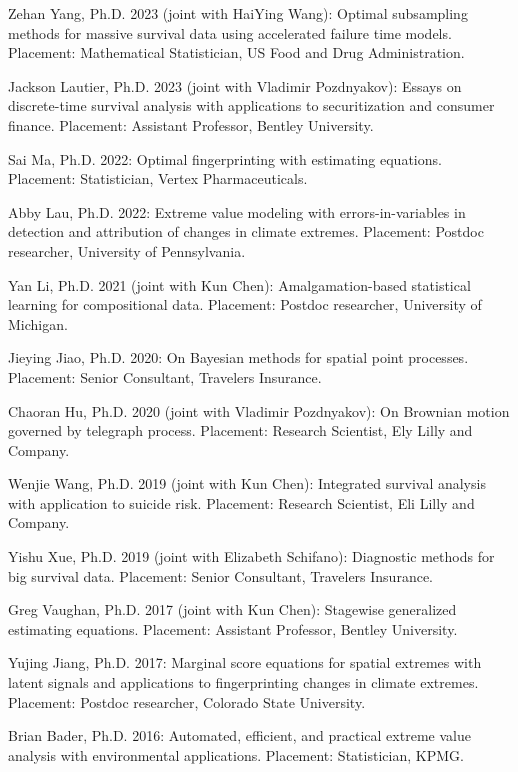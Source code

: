 \documentclass[Statistics]{vita}
\begin{document}
\begin{vita}
\begin{Students}
\begin{Ph.D.}
    \item Zehan Yang, Ph.D. 2023 (joint with HaiYing Wang): Optimal subsampling methods for massive survival data using accelerated failure time models. Placement: Mathematical Statistician, US Food and Drug Administration.
    \item Jackson Lautier, Ph.D. 2023 (joint with Vladimir Pozdnyakov): Essays on discrete-time survival analysis with applications to securitization and consumer finance. Placement: Assistant Professor, Bentley University. 
    \item Sai Ma, Ph.D. 2022: Optimal fingerprinting with estimating equations. Placement: Statistician, Vertex Pharmaceuticals.
    \item Abby Lau, Ph.D. 2022: Extreme value modeling with errors-in-variables in detection and attribution of changes in climate extremes. Placement: Postdoc researcher, University of Pennsylvania.
    \item Yan Li, Ph.D. 2021 (joint with Kun Chen): Amalgamation-based statistical learning for compositional data. Placement: Postdoc researcher, University of Michigan.
    \item Jieying Jiao, Ph.D. 2020: On Bayesian methods for spatial point processes. Placement: Senior Consultant, Travelers Insurance.
    \item Chaoran Hu, Ph.D. 2020 (joint with Vladimir Pozdnyakov): On Brownian motion governed by telegraph process. Placement: Research Scientist, Ely Lilly and Company.
    \item Wenjie Wang, Ph.D. 2019 (joint with Kun Chen): Integrated survival analysis with application to suicide risk. Placement: Research Scientist, Eli Lilly and Company.
    \item Yishu Xue, Ph.D. 2019 (joint with Elizabeth Schifano): Diagnostic methods for big survival data. Placement: Senior Consultant, Travelers Insurance.
    \item Greg Vaughan, Ph.D. 2017 (joint with Kun Chen): Stagewise generalized estimating equations. Placement: Assistant Professor, Bentley University.
    \item Yujing Jiang, Ph.D. 2017: Marginal score equations for spatial extremes with latent signals and applications to fingerprinting changes in climate extremes. Placement: Postdoc researcher, Colorado State University.
    \item Brian Bader, Ph.D. 2016: Automated, efficient, and practical extreme value analysis with environmental applications. Placement: Statistician, KPMG.

\end{Ph.D.}
\end{Students}
\end{vita}
\end{document}
